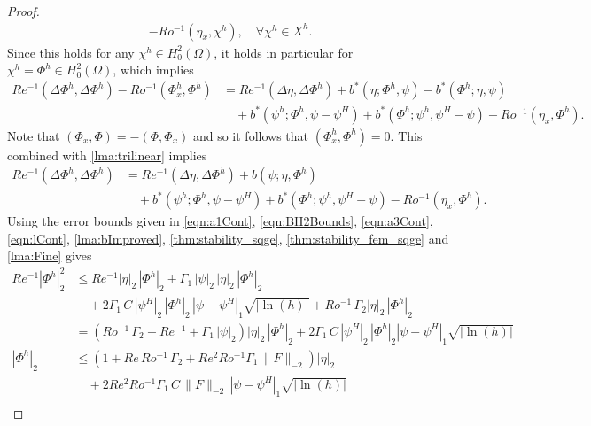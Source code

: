 \begin{proof}
\begin{equation*}
\begin{split}
        - Ro^{-1} (\eta_x,\chi^h),
      \quad \forall \chi^h \in X^h.
    \end{split}
  \end{equation*}
  Since this holds for any $\chi^h\in H^2_0(\Omega)$, it holds in particular for
  $\chi^h=\Phi^h\in H^2_0(\Omega)$, which implies
  \begin{equation*}
    \begin{split}
      Re^{-1} (\Delta \Phi^h, \Delta \Phi^h) - Ro^{-1} (\Phi^h_x,\Phi^h)
        &= Re^{-1} (\Delta \eta, \Delta \Phi^h)
        + b^*(\eta;\Phi^h, \psi) - b^*(\Phi^h;\eta,\psi) \\
      &\quad+ b^*(\psi^h;\Phi^h,\psi-\psi^H) + b^*(\Phi^h; \psi^h,\psi^H-\psi)
        - Ro^{-1} (\eta_x,\Phi^h).
    \end{split}
  \end{equation*}
  Note that $(\Phi_x,\Phi) = -(\Phi,\Phi_x)$ and so it follows that
  $(\Phi^h_x,\Phi^h) = 0$. This combined with \autoref{lma:trilinear} implies
  \begin{equation*}
    \begin{split}
      Re^{-1} (\Delta \Phi^h, \Delta \Phi^h) &= Re^{-1} (\Delta \eta, \Delta \Phi^h)
        + b(\psi;\eta,\Phi^h) \\
      &\quad+ b^*(\psi^h;\Phi^h,\psi-\psi^H) + b^*(\Phi^h; \psi^h,\psi^H-\psi)
        - Ro^{-1} (\eta_x,\Phi^h).
    \end{split}
  \end{equation*}
  Using the error bounds given in \eqref{eqn:a1Cont}, \eqref{eqn:BH2Bounds},
  \eqref{eqn:a3Cont}, \eqref{eqn:lCont}, \autoref{lma:bImproved},
  \autoref{thm:stability_sqge}, \autoref{thm:stability_fem_sqge} and
  \autoref{lma:Fine} gives
  \begin{align*}
    Re^{-1} |\Phi^h|_2^2 &\le Re^{-1} |\eta|_2\, |\Phi^h|_2 + \Gamma_1\,
      |\psi|_2\, |\eta|_2\, |\Phi^h|_2 \\
    &\quad+ 2 \Gamma_1\, C\, |\psi^H|_2\, |\Phi^h|_2\, |\psi - \psi^H|_1
      \sqrt{|\ln(h)|} + Ro^{-1}\, \Gamma_2 |\eta|_2\, |\Phi^h|_2 \\
    &= \left(Ro^{-1}\, \Gamma_2 + Re^{-1} + \Gamma_1\, |\psi|_2\right) |\eta|_2\,
      |\Phi^h|_2 + 2 \Gamma_1\, C\, |\psi^H|_2\, |\Phi^h|_2 |\psi - \psi^H|_1
      \sqrt{|\ln(h)|}  \\
    |\Phi^h|_2 &\le \left(1 + Re\, Ro^{-1}\, \Gamma_2 + Re^2 Ro^{-1} \Gamma_1\,
      \|F\|_{-2}\right) |\eta|_2 \\
      &\quad + 2 Re^2 Ro^{-1} \Gamma_1\, C\, \|F\|_{-2}\, |\psi - \psi^H|_1 \sqrt{|\ln(h)|} \\

\end{align*}
\end{proof}
